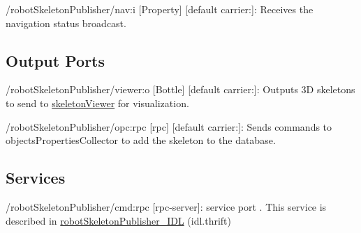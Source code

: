 \begin{DoxyItemize}
\item /robot\+Skeleton\+Publisher/nav\+:i \mbox{[}Property\mbox{]} \mbox{[}default carrier\+:\mbox{]}\+: Receives the navigation status broadcast.
\end{DoxyItemize}\hypertarget{group__skeletonViewer_outputports_sec}{}\subsection{Output Ports}\label{group__skeletonViewer_outputports_sec}

\begin{DoxyItemize}
\item /robot\+Skeleton\+Publisher/viewer\+:o \mbox{[}Bottle\mbox{]} \mbox{[}default carrier\+:\mbox{]}\+: Outputs 3D skeletons to send to \mbox{\hyperlink{group__skeletonViewer}{skeleton\+Viewer}} for visualization.
\item /robot\+Skeleton\+Publisher/opc\+:rpc \mbox{[}rpc\mbox{]} \mbox{[}default carrier\+:\mbox{]}\+: Sends commands to objects\+Properties\+Collector to add the skeleton to the database.
\end{DoxyItemize}\hypertarget{group__skeletonViewer_services_sec}{}\subsection{Services}\label{group__skeletonViewer_services_sec}

\begin{DoxyItemize}
\item /robot\+Skeleton\+Publisher/cmd\+:rpc \mbox{[}rpc-\/server\mbox{]}\+: service port . This service is described in \mbox{\hyperlink{classrobotSkeletonPublisher__IDL}{robot\+Skeleton\+Publisher\+\_\+\+I\+DL}} (idl.\+thrift) 
\end{DoxyItemize}